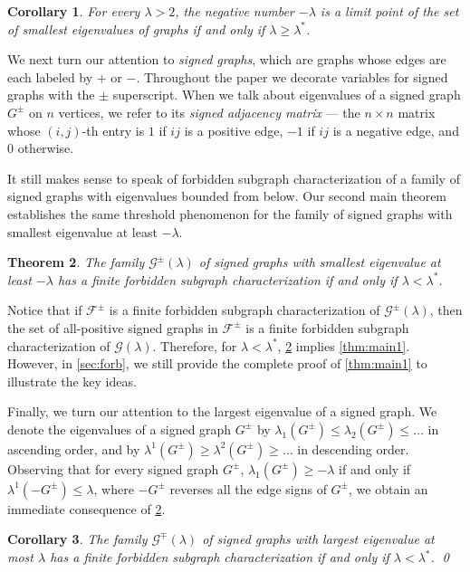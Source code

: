 \documentclass[11pt]{article}
\newtheorem{theorem}{Theorem}[section]
\newtheorem{corollary}[theorem]{Corollary}
\theoremstyle{definition}
\theoremstyle{remark}
\newcommand{\la}{\lambda}
\newcommand{\F}{\mathcal{F}}
\newcommand{\G}{\mathcal{G}}
\newcommand{\Gl}{\G(\la)}
\newcommand{\Gs}{\G^\pm(\la)}
\newcommand{\Gsp}{\G^\mp(\la)}
\begin{document}
\begin{corollary} \label{cor:main1}
    For every $\la > 2$, the negative number $-\la$ is a limit point of the set of smallest eigenvalues of graphs if and only if $\la \ge \la^*$.
\end{corollary}

We next turn our attention to \emph{signed graphs}, which are graphs whose edges are each labeled by $+$ or $-$. Throughout the paper we decorate variables for signed graphs with the $\pm$ superscript. When we talk about eigenvalues of a signed graph $G^\pm$ on $n$ vertices, we refer to its \emph{signed adjacency matrix} --- the $n \times n$ matrix whose $(i,j)$-th entry is $1$ if $ij$ is a positive edge, $-1$ if $ij$ is a negative edge, and $0$ otherwise.

It still makes sense to speak of forbidden subgraph characterization of a family of signed graphs with eigenvalues bounded from below. Our second main theorem establishes the same threshold phenomenon for the family of signed graphs with smallest eigenvalue at least $-\la$.

\begin{theorem} \label{thm:main2}
    The family $\Gs$ of signed graphs with smallest eigenvalue at least $-\la$ has a finite forbidden subgraph characterization if and only if $\la < \la^*$.
\end{theorem}

Notice that if $\F^\pm$ is a finite forbidden subgraph characterization of $\Gs$, then the set of all-positive signed graphs in $\F^\pm$ is a finite forbidden subgraph characterization of $\Gl$. Therefore, for $\la < \la^*$, \cref{thm:main2} implies \cref{thm:main1}. However, in \cref{sec:forb}, we still provide the complete proof of \cref{thm:main1} to illustrate the key ideas.

Finally, we turn our attention to the largest eigenvalue of a signed graph. We denote the eigenvalues of a signed graph $G^\pm$ by $\la_1(G^\pm) \le \la_2(G^\pm) \le \dots $ in ascending order, and by $\la^1(G^\pm) \ge \la^2(G^\pm) \ge \dots$ in descending order. Observing that for every signed graph $G^\pm$, $\la_1(G^\pm) \ge -\la$ if and only if $\la^1(-G^\pm) \le \la$, where $-G^\pm$ reverses all the edge signs of $G^\pm$, we obtain an immediate consequence of \cref{thm:main2}.

\begin{corollary} \label{cor:main2}
    The family $\Gsp$ of signed graphs with largest eigenvalue at most $\la$ has a finite forbidden subgraph characterization if and only if $\la < \la^*$. \qed
\end{corollary}
\end{document}
